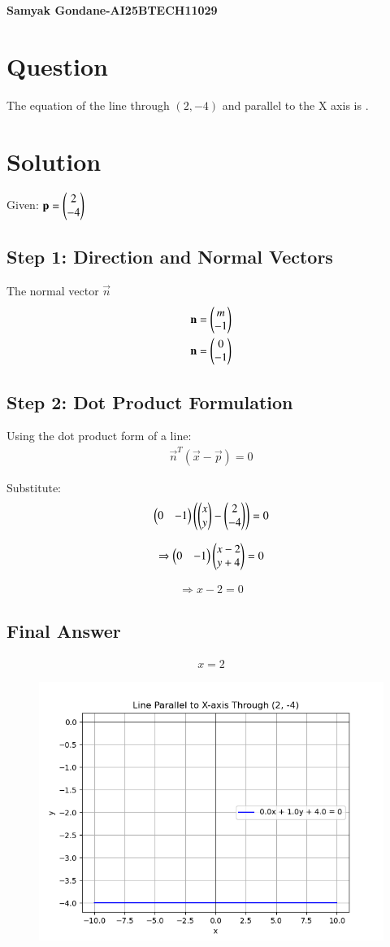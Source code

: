 \documentclass{article}
\begin{document}
\begin{center}
\large
    \textbf{Samyak Gondane-AI25BTECH11029}
\end{center}
\date{}

\section*{Question}
The equation of the line through $(2, -4)$ and parallel to the X axis is \underline{\hspace{2 cm}}.

\section*{Solution}
Given: $\mathbf{p} = \begin{pmatrix}2 \\ -4\end{pmatrix}$

\subsection*{Step 1: Direction and Normal Vectors}
The normal vector $\vec{n}$
\begin{align}
\mathbf{n} = \begin{pmatrix}m \\ -1\end{pmatrix}\\
\mathbf{n} = \begin{pmatrix}0 \\ -1\end{pmatrix}
\end{align}

\subsection*{Step 2: Dot Product Formulation}
Using the dot product form of a line:
\begin{align}
\vec{n}^T (\vec{x} - \vec{p}) = 0
\end{align}

Substitute:
\begin{align}
\begin{pmatrix}0 & -1\end{pmatrix} \begin{pmatrix}\begin{pmatrix}x \\ y\end{pmatrix} - \begin{pmatrix}2 \\ -4\end{pmatrix}\end{pmatrix} = 0
\end{align}

\begin{align}
\Rightarrow \begin{pmatrix}0 & -1\end{pmatrix} \begin{pmatrix}x - 2 \\ y + 4\end{pmatrix} = 0
\end{align}

\begin{align}
\Rightarrow x - 2 = 0
\end{align}

\subsection*{Final Answer}
\begin{align}
\boxed{x = 2}
\end{align}

\begin{figure}[H]
    \centering
    \includegraphics[width=0.5\linewidth]{./figs/Figure_1.png}
    \caption{}
    \label{fig:fig1}
\end{figure}
\end{document}

